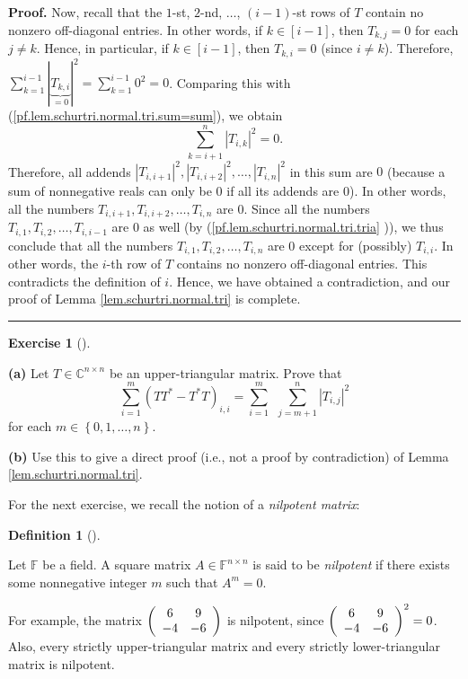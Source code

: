 \documentclass[numbers=enddot,12pt,final,onecolumn,notitlepage]{scrartcl}%
\newcounter{exer}
\numberwithin{exer}{subsection}
\theoremstyle{definition}
\newtheorem{defi}[theo]{Definition}
\newenvironment{definition}[1][]
{\begin{defi}[#1]\begin{leftbar}}
{\end{leftbar}\end{defi}}
\newtheorem{exmp}[exer]{Exercise}
\newenvironment{exercise}[1][]
{\begin{exmp}[#1]\begin{leftbar}}
{\end{leftbar}\end{exmp}}
\newenvironment{proof}[1][Proof]{\noindent\textbf{#1.} }{\ \rule{0.5em}{0.5em}}
\let\sumnonlimits\sum
\renewcommand{\sum}{\sumnonlimits\limits}
\begin{document}
\begin{proof}
Now, recall that the $1$-st, $2$-nd, $\ldots$, $\left(  i-1\right)  $-st rows
of $T$ contain no nonzero off-diagonal entries. In other words, if
$k\in\left[  i-1\right]  $, then $T_{k,j}=0$ for each $j\neq k$. Hence, in
particular, if $k\in\left[  i-1\right]  $, then $T_{k,i}=0$ (since $i\neq k$).
Therefore, $\sum_{k=1}^{i-1}\left\vert \underbrace{T_{k,i}}_{=0}\right\vert
^{2}=\sum_{k=1}^{i-1}0^{2}=0$. Comparing this with
(\ref{pf.lem.schurtri.normal.tri.sum=sum}), we obtain%
\[
\sum_{k=i+1}^{n}\left\vert T_{i,k}\right\vert ^{2}=0.
\]
Therefore, all addends $\left\vert T_{i,i+1}\right\vert ^{2},\left\vert
T_{i,i+2}\right\vert ^{2},\ldots,\left\vert T_{i,n}\right\vert ^{2}$ in this
sum are $0$ (because a sum of nonnegative reals can only be $0$ if all its
addends are $0$). In other words, all the numbers $T_{i,i+1},T_{i,i+2}%
,\ldots,T_{i,n}$ are $0$. Since all the numbers $T_{i,1},T_{i,2}%
,\ldots,T_{i,i-1}$ are $0$ as well (by (\ref{pf.lem.schurtri.normal.tri.tria}%
)), we thus conclude that all the numbers $T_{i,1},T_{i,2},\ldots,T_{i,n}$ are
$0$ except for (possibly) $T_{i,i}$. In other words, the $i$-th row of $T$
contains no nonzero off-diagonal entries. This contradicts the definition of
$i$. Hence, we have obtained a contradiction, and our proof of Lemma
\ref{lem.schurtri.normal.tri} is complete.
\end{proof}

\begin{exercise}
\label{lem.schurtri.normal.tri.2} \textbf{(a)} Let $T\in
\mathbb{C}^{n\times n}$ be an upper-triangular matrix. Prove that%
\[
\sum_{i=1}^{m}\left(  TT^{\ast}-T^{\ast}T\right)  _{i,i}=\sum_{i=1}%
^{m}\ \ \sum_{j=m+1}^{n}\left\vert T_{i,j}\right\vert ^{2}%
\]
for each $m\in\left\{  0,1,\ldots,n\right\}  $. \medskip

\textbf{(b)} Use this to give a direct proof (i.e., not a proof by
contradiction) of Lemma \ref{lem.schurtri.normal.tri}.
\end{exercise}

For the next exercise, we recall the notion of a \emph{nilpotent matrix}:

\begin{definition}
Let $\mathbb{F}$ be a field. A square matrix $A\in\mathbb{F}^{n\times n}$ is
said to be \emph{nilpotent} if there exists some nonnegative integer $m$ such
that $A^{m}=0$.
\end{definition}

For example, the matrix $\left(
\begin{array}
[c]{cc}%
6 & 9\\
-4 & -6
\end{array}
\right)  $ is nilpotent, since $\left(
\begin{array}
[c]{cc}%
6 & 9\\
-4 & -6
\end{array}
\right)  ^{2}=0$. Also, every strictly upper-triangular matrix and every
strictly lower-triangular matrix is nilpotent.
\end{document}
